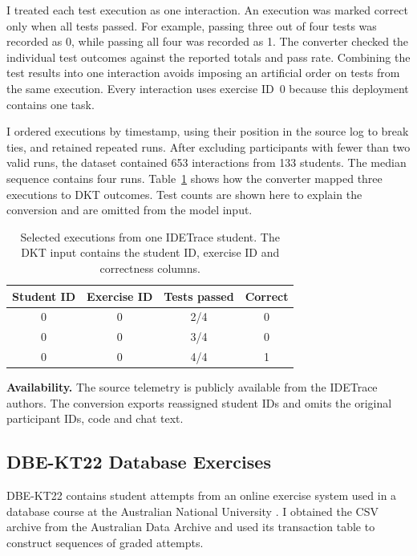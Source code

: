 \documentclass[11pt]{article}
\begin{document}
I treated each test execution as one interaction. An execution was
marked correct only when all tests passed. For example, passing three
out of four tests was recorded as 0, while passing all four was
recorded as 1. The converter checked the individual test outcomes
against the reported totals and pass rate. Combining the test results
into one interaction avoids imposing an artificial order on tests
from the same execution. Every interaction uses exercise ID~0 because
this deployment contains one task.

I ordered executions by timestamp, using their position in the source
log to break ties, and retained repeated runs. After excluding
participants with fewer than two valid runs, the dataset contained
653 interactions from 133 students. The median sequence contains
four runs. Table~\ref{tab:idetrace-input} shows how the converter
mapped three executions to DKT outcomes. Test counts are shown here
to explain the conversion and are omitted from the model input.

\begin{table}[H]
\centering
\small
\begin{tabular}{@{}cccc@{}}
\hline
Student ID & Exercise ID & Tests passed & Correct \\
\hline
0 & 0 & 2/4 & 0 \\
0 & 0 & 3/4 & 0 \\
0 & 0 & 4/4 & 1 \\
\hline
\end{tabular}
\caption{Selected executions from one IDETrace student. The DKT
input contains the student ID, exercise ID and correctness columns.}
\label{tab:idetrace-input}
\end{table}

\textbf{Availability.} The source telemetry is publicly available
from the IDETrace authors. The conversion exports reassigned student
IDs and omits the original participant IDs, code and chat text.

\subsection{DBE-KT22 Database Exercises}

DBE-KT22 contains student attempts from an online exercise system
used in a database course at the Australian National University
\citep{abdelrahman2022dbekt22}. I obtained the CSV archive from the
Australian Data Archive and used its transaction table to construct
sequences of graded attempts.
\end{document}
